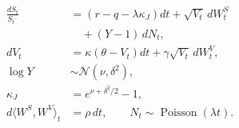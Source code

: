 \documentclass{equation-sheet}
\begin{document}
\begin{equation*}
\begin{aligned}
\frac{dS_t}{S_{t^-}}
  &= \left(r-q-\lambda\kappa_J\right)dt
     + \sqrt{V_t}\,dW_t^S \\
  &\quad + (Y-1)\,dN_t, \\
dV_t
  &= \kappa(\theta-V_t)dt + \gamma\sqrt{V_t}\,dW_t^V, \\
\log Y &\sim \mathcal N(\nu,\delta^2), \\
\kappa_J&=e^{\nu+\delta^2/2}-1, \\
d\langle W^S,W^V\rangle_t &= \rho\,dt,
\qquad N_t\sim\operatorname{Poisson}(\lambda t).
\end{aligned}
\end{equation*}
\end{document}

